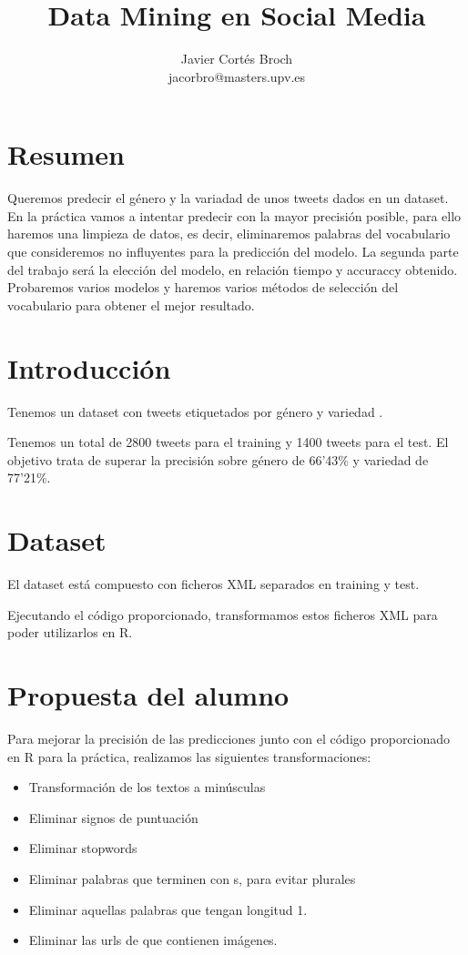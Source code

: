\documentclass[12pt]{article}
\title{%
	Data Mining en Social Media}
\author{Javier Cort\'es Broch \\
	\large jacorbro@masters.upv.es}
\begin{document}
	\maketitle
	
	\begin{multicols}{2}
		\section*{\hfil Resumen\hfil}
		Queremos predecir el g\'enero y la variadad de unos tweets dados en un dataset. En la pr\'actica vamos a intentar predecir con la mayor precisi\'on posible, para ello haremos una limpieza de datos, es decir, eliminaremos palabras del vocabulario que consideremos no influyentes para la predicci\'on del modelo.
		La segunda parte del trabajo ser\'a la elecci\'on del modelo, en relaci\'on tiempo y accuraccy obtenido.
		Probaremos varios modelos y haremos varios m\'etodos de selecci\'on del vocabulario para obtener el mejor resultado.
		
		
		\section{Introducci\'on}
		Tenemos un dataset con tweets etiquetados por g\'enero y variedad .
		
		Tenemos un total de 2800 tweets para el training y 1400 tweets para el test.
		El objetivo trata de superar la precisi\'on sobre g\'enero de 66'43\% y variedad de 77'21\%.
		
		\section{Dataset}
		El dataset est\'a compuesto con ficheros XML separados en training y test.
		
		Ejecutando el c\'odigo proporcionado, transformamos estos ficheros XML para poder utilizarlos en R.
		
		\section{Propuesta del alumno}
		Para mejorar la precisi\'on de las predicciones junto con el c\'odigo proporcionado en R para la pr\'actica, realizamos las siguientes transformaciones:
		
		\begin{itemize}
			\item Transformaci\'on de los textos a min\'usculas
			\item Eliminar signos de puntuaci\'on
			\item Eliminar stopwords
			\item Eliminar palabras que terminen con s, para evitar plurales
			\item Eliminar aquellas palabras que tengan longitud 1.
			\item Eliminar las urls de que contienen im\'agenes.
		\end{itemize}
		

\end{multicols}
\end{document}
